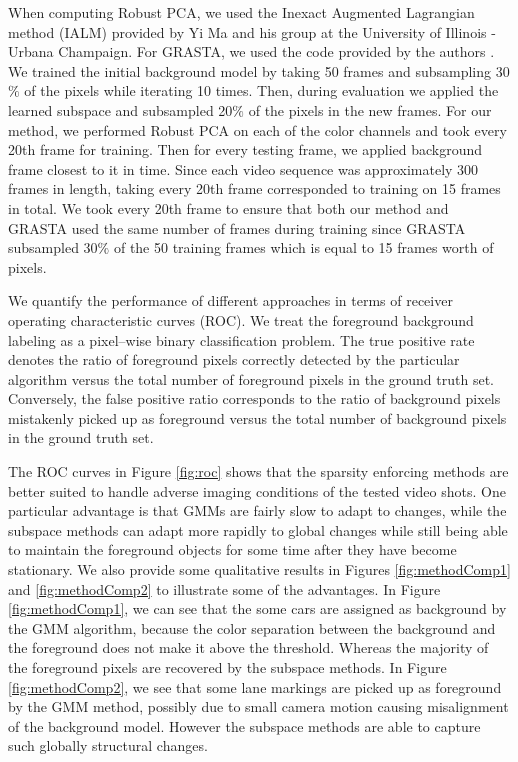 \documentclass{article}
\begin{document}
When computing Robust PCA, we used the Inexact Augmented Lagrangian method (IALM) \cite{alm} provided by Yi Ma and his group at the University of Illinois - Urbana Champaign. For GRASTA, we used the code provided by the authors \cite{grastaCode}. We trained the initial background model by taking 50 frames and subsampling 30$\%$ of the pixels while iterating 10 times. Then, during evaluation we applied the learned subspace and subsampled 20$\%$ of the pixels in the new frames. For our method, we performed Robust PCA on each of the color channels and took every 20th frame for training. Then for every testing frame, we applied background frame closest to it in time. Since each video sequence was approximately 300 frames in length, taking every 20th frame corresponded to training on 15 frames in total. We took every 20th frame to ensure that both our method and GRASTA used the same number of frames during training since GRASTA subsampled 30$\%$ of the 50 training frames which is equal to 15 frames worth of pixels.

We quantify the performance of different approaches in terms of receiver operating characteristic curves (ROC).  We treat the foreground background labeling as a pixel--wise binary classification problem.  The true positive rate denotes the ratio of foreground pixels correctly detected by the particular algorithm versus the total number of foreground pixels in the ground truth set.  Conversely, the false positive ratio corresponds to the ratio of background pixels mistakenly picked up as foreground versus the total number of background pixels in the ground truth set.

The ROC curves in Figure \ref{fig:roc} shows that the sparsity enforcing methods are better suited to handle adverse imaging conditions of the tested video shots.  One particular advantage is that GMMs are fairly slow to adapt to changes, while the subspace methods can adapt more rapidly to global changes while still being able to maintain the foreground objects for some time after they have become stationary. We also provide some qualitative results in Figures \ref{fig:methodComp1} and \ref{fig:methodComp2} to illustrate some of the advantages.  In Figure \ref{fig:methodComp1}, we can see that the some cars are assigned as background by the GMM algorithm, because the color separation between the background and the foreground does not make it above the threshold.  Whereas the majority of the foreground pixels are recovered by the subspace methods.  In Figure \ref{fig:methodComp2}, we see that some lane markings are picked up as foreground by the GMM method, possibly due to small camera motion causing misalignment of the background model.  However the subspace methods are able to capture such globally structural changes.
\end{document}
